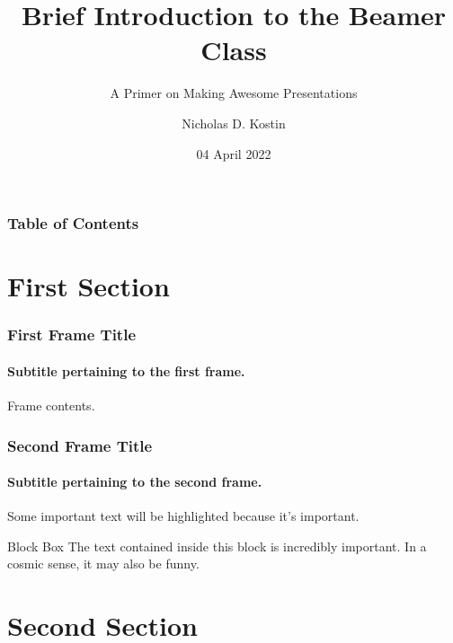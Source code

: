\documentclass[aspectratio=169]{beamer}
\title{Brief Introduction to the Beamer Class}
\subtitle{A Primer on Making Awesome Presentations}
\author{Nicholas D. Kostin}
\date{04 April 2022}
\numberwithin{equation}{section}
\begin{document}
\frame{\titlepage}

\begin{frame}
    \frametitle{Table of Contents}
    \tableofcontents
\end{frame}

\section{First Section}

\begin{frame}
\frametitle{First Frame Title}
\framesubtitle{Subtitle pertaining to the first frame.}

Frame contents.

\end{frame}

\begin{frame}
\frametitle{Second Frame Title}
\framesubtitle{Subtitle pertaining to the second frame.}

Some important text will be \alert{highlighted} because it's important.

\vfill

\begin{block}{Block Box}
    The text contained inside this block is incredibly important. In a cosmic sense, it may also be funny.
\end{block}

\end{frame}

\section{Second Section}
\end{document}
